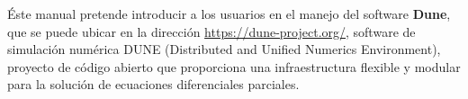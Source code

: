 Éste manual pretende introducir a los usuarios en el manejo del software \textbf{Dune}, 
que se puede ubicar en la dirección 
\url{https://dune-project.org/}, software de simulación numérica DUNE (Distributed and Unified Numerics Environment), 
proyecto de código abierto que proporciona una infraestructura flexible y 
modular para la solución de ecuaciones diferenciales parciales.